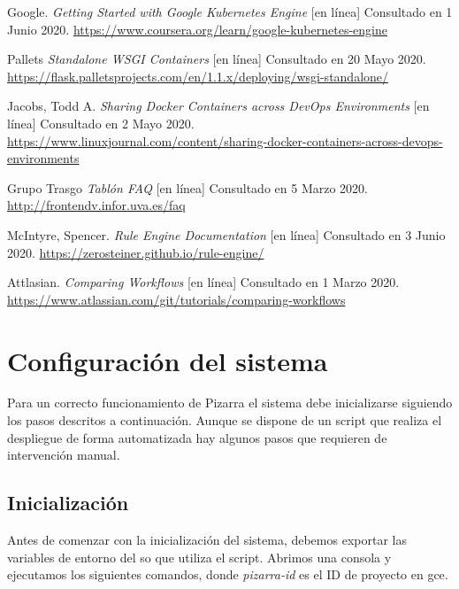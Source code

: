 \documentclass[11pt,spanish,listoffigures,listoftables]{tfgetsinf}
\begin{document}
\begin{thebibliography}{10}
	Google. \textit{Getting Started with Google Kubernetes Engine} [en línea]
	\newblock Consultado en 1 Junio 2020.
	\url{https://www.coursera.org/learn/google-kubernetes-engine}
	
	Pallets \textit{Standalone WSGI Containers} [en línea]
	\newblock Consultado en 20 Mayo 2020.
	\url{https://flask.palletsprojects.com/en/1.1.x/deploying/wsgi-standalone/}
	
	Jacobs, Todd A. \textit{Sharing Docker Containers across DevOps Environments} [en línea]
	\newblock Consultado en 2 Mayo 2020.
	\url{https://www.linuxjournal.com/content/sharing-docker-containers-across-devops-environments}
	
	Grupo Trasgo \textit{Tablón FAQ} [en línea]
	\newblock Consultado en 5 Marzo 2020.
	\url{http://frontendv.infor.uva.es/faq}
	
	McIntyre, Spencer. \textit{Rule Engine Documentation} [en línea]
	\newblock Consultado en 3 Junio 2020.
	\url{https://zerosteiner.github.io/rule-engine/}
	
	Attlasian. \textit{Comparing Workflows} [en línea]
	\newblock Consultado en 1 Marzo 2020.
	\url{https://www.atlassian.com/git/tutorials/comparing-workflows}


\end{thebibliography}
\cleardoublepage

\APPENDIX

\chapter{Configuración del sistema}

Para un correcto funcionamiento de Pizarra el sistema debe inicializarse siguiendo los pasos descritos a continuación. Aunque se dispone de un script que realiza el despliegue de forma automatizada hay algunos pasos que requieren de intervención manual.

\section{Inicialización}

Antes de comenzar con la inicialización del sistema, debemos exportar las variables de entorno del \acrshort{so} que utiliza el script. Abrimos una consola y ejecutamos los siguientes comandos, donde \textit{pizarra-id} es el ID de proyecto en \acrfull{gce}.
\end{document}
